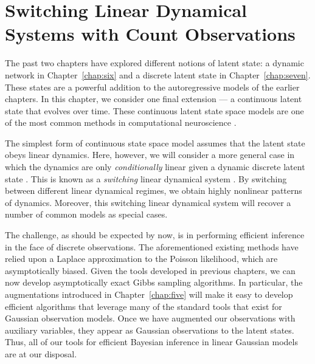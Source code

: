\chapter{Switching Linear Dynamical Systems with Count Observations}
\label{chap:eight}

The past two chapters have explored different notions of latent
state: a dynamic network in Chapter~\ref{chap:six} and a discrete
latent state in Chapter~\ref{chap:seven}. These states are a powerful
addition to the autoregressive models of the earlier chapters. In
this chapter, we consider one final extension --- a continuous
latent state that evolves over time. These continuous latent state
space models are one of the most common methods in computational
neuroscience \citep{Smith-2003, paninski2010new, macke2011empirical,
  Buesing12, Petreska-2011, cunningham2014dimensionality}.

The simplest form of continuous state space model assumes that the
latent state obeys linear dynamics. Here, however, we will consider a
more general case in which the dynamics are only \emph{conditionally}
linear given a dynamic discrete latent state \citep{Petreska-2011}.
This is known as a \emph{switching} linear dynamical system
\citep{murphy2012probabilistic, fox2009bayesian}.  By switching
between different linear dynamical regimes, we obtain highly nonlinear
patterns of dynamics. Moreover, this switching linear dynamical system
will recover a number of common models as special cases.

The challenge, as should be expected by now, is in performing
efficient inference in the face of discrete observations. The
aforementioned existing methods have relied upon a Laplace
approximation to the Poisson likelihood, which are asymptotically
biased. Given the tools developed in previous chapters, we can now
develop asymptotically exact Gibbs sampling algorithms. In particular,
the \polyagamma augmentations introduced in Chapter~\ref{chap:five}
will make it easy to develop efficient algorithms that leverage many
of the standard tools that exist for Gaussian observation models. Once
we have augmented our observations with \polyagamma auxiliary
variables, they appear as Gaussian observations to the latent
states. Thus, all of our tools for efficient Bayesian inference in
linear Gaussian models are at our disposal.

